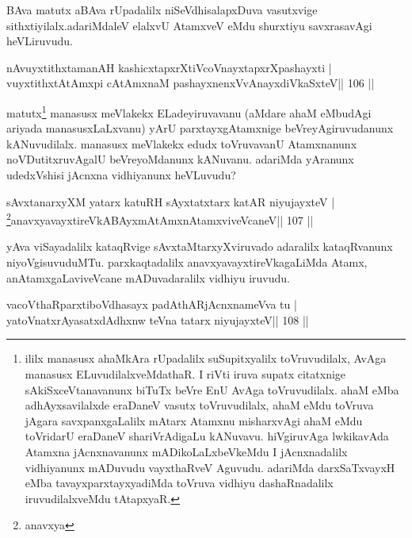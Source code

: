 \begin{artha}
BAva matutx aBAva rUpadalilx niSeVdhisalapxDuva vasutxvige sithxtiyilalx.\break adariMdaleV elalxvU AtamxveV eMdu shurxtiyu savxrasavAgi heVLiruvudu.
\end{artha}

\begin{shl}
nAvuyxtithxtamanAH kashicxtapxrXtiVcoV\s nayxtapxrXpashayxti |
vuyxtithxtAtAmx\s pi cA\s\s tAmxnaM pashayxnenxVvAnayxdiVkaSxteV\hfill || 106 ||
\end{shl}

\begin{artha}
matutx\footnote{ililx manasusx ahaMkAra rUpadalilx suSupitxyalilx
 toVruvudilalx, AvAga manasusx ELuvudilalxveMdathaR. I riVti iruva
 supatx citatxnige sAkiSxceVtanavanunx biTuTx beVre EnU
 AvAga toVruvudilalx. ahaM eMba adhAyxsavilalxde eraDaneV vasutx
 toVruvudilalx, ahaM eMdu toVruva jAgara savxpanxgaLalilx mAtarx
 Atamxnu misharxvAgi ahaM eMdu toVridarU eraDaneV shariVrAdigaLu
 kANuvavu. hiVgiruvAga lwkikavAda Atamxna jAcnxnavanunx
 mADikoLaLxbeVkeMdu I jAcnxnadalilx vidhiyanunx mADuvudu vayxthaRveV
 Aguvudu. adariMda darxSaTxvayxH eMba tavayxparxtayxyadiMda toVruva
 vidhiyu dashaRnadalilx iruvudilalxveMdu tAtapxyaR.} manasusx 
 meVlakekx ELadeyiruvavanu (aMdare ahaM eMbudAgi ariyada 
 manasusxLaLxvanu) yArU parxtayxgAtamxnige 
beVreyAgiruvudanunx kANuvudilalx. manasusx meVlakekx edudx toVruvavanU
Atamxnanunx noVDutitxruvAgalU beVreyoMdanunx kANuvanu. adariMda
yAranunx udedxVshisi jAcnxna vidhiyanunx heVLuvudu?
\end{artha}

\begin{shl}
sAvxtanarxyXM yatarx katuRH sAyxtatxtarx katAR niyujayxteV |
\footnote{anavxya}anavxyavayxtireVkABAyxmAtAmxnAtamxviveVcaneV\hfill || 107 ||
\end{shl}

\begin{artha}
yAva viSayadalilx kataqRvige sAvxtaMtarxyXviruvado adaralilx
kataqRvanunx niyoVgisuvuduMTu. parxkaqtadalilx
anavxyavayxtireVkagaLiMda Atamx, anAtamxgaLa\break viveVcane mADuvadaralilx
vidhiyu iruvudu.
\end{artha}


\begin{shl}
vacoVthaRparxtiboVdhasayx padAthARjAcnxnameVva tu |
yatoV\s natxrAyasatxdAdhxnw teVna tatarx niyujayxteV\hfill || 108 ||
\end{shl}

